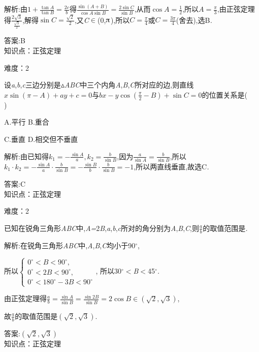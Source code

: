 \documentclass{article} %
\begin{document}
 解析:由$1+\frac{\tan A}{\tan B}=\frac{2c}{b}$得$\frac{\sin (A+B)}{\cos A\sin B}=\frac{2\sin C}{\sin B}$,从而$\cos A=\frac{1}{2}$,所以$A=\frac{\pi}{3}$,由正弦定理得$\frac{2\sqrt{3}}{\frac{\sqrt{3}}{2}}$,解得$\sin C=\frac{\sqrt{2}}{2}$,又\textit{C}$\mathrm{\in}$(0,$\piup$),所以$C=\frac{\pi}{4}$或$C=\frac{3\pi}{4}$(舍去),选B\textit{.}

 答案:B \\

知识点：正弦定理

难度：2

 设\textit{a},\textit{b},\textit{c}三边分别是$\mathrm{\vartriangle}$\textit{ABC}中三个内角\textit{A},\textit{B},\textit{C}所对应的边,则直线$x\sin(\pi -A)+ay+c=0$与$bx-y\cos(\frac{\pi}{2}-B)+\sin C=0$的位置关系是(\textit{　　})

 A.平行 B.重合

 C.垂直 D.相交但不垂直

 解析:由已知得$k_1=-\frac{\sin A}{a},k_2=\frac{b}{\sin B}$,因为$\frac{a}{\sin A}=\frac{b}{\sin B}$,所以$k_1\cdot k_2=-\frac{\sin A}{a}\cdot \frac{b}{\sin B}=-\frac{\sin B}{b}\cdot \frac{b}{\sin B}=-1$,所以两直线垂直,故选C\textit{.}

 答案:C \\

知识点：正弦定理

难度：2

 已知在锐角三角形\textit{ABC}中,\textit{A=}2\textit{B},\textit{a},\textit{b},\textit{c}所对的角分别为\textit{A},\textit{B},\textit{C},则$\frac{a}{b}$的取值范围是\textit{\underbar{　　　　　}.~}

 解析:在锐角三角形\textit{ABC}中,\textit{A},\textit{B},\textit{C}均小于90$\mathrm{{}^\circ}$,

所以$\left\{
\begin{array}{l}
0^{\circ} < B < 90^{\circ} , \\
0^{\circ} < 2B < 90^{\circ}, \\
0^{\circ} < 180^{\circ} -3B < 90^{\circ}
\end{array}
\right.$, 所以30$\mathrm{{}^\circ}$\textit{$<$B$<$}45$\mathrm{{}^\circ}$\textit{.}

由正弦定理得$\frac{a}{b}=\frac{\sin A}{\sin B}=\frac{\sin 2B}{\sin B}=2\cos B\in (\sqrt{2},\sqrt{3})$,

故$\frac{a}{b}$的取值范围是$(\sqrt{2},\sqrt{3})$.

 答案:$(\sqrt{2},\sqrt{3})$ \\

知识点：正弦定理
\end{document}
